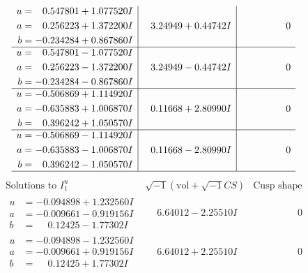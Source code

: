 \documentclass[1p]{elsarticle_modified}
\theoremstyle{definition}
\newcommand{\I}{\sqrt{-1}}
\begin{document}
$$\begin{array}{c|c|c}
\begin{aligned}
u &= \phantom{-}0.547801 + 1.077520 I \\
a &= \phantom{-}0.256223 + 1.372200 I \\
b &= -0.234284 + 0.867860 I\end{aligned}
 & \phantom{-}3.24949 + 0.44742 I & \phantom{-0.000000 } 0 \\ \hline\begin{aligned}
u &= \phantom{-}0.547801 - 1.077520 I \\
a &= \phantom{-}0.256223 - 1.372200 I \\
b &= -0.234284 - 0.867860 I\end{aligned}
 & \phantom{-}3.24949 - 0.44742 I & \phantom{-0.000000 } 0 \\ \hline\begin{aligned}
u &= -0.506869 + 1.114920 I \\
a &= -0.635883 + 1.006870 I \\
b &= \phantom{-}0.396242 + 1.050570 I\end{aligned}
 & \phantom{-}0.11668 + 2.80990 I & \phantom{-0.000000 } 0 \\ \hline\begin{aligned}
u &= -0.506869 - 1.114920 I \\
a &= -0.635883 - 1.006870 I \\
b &= \phantom{-}0.396242 - 1.050570 I\end{aligned}
 & \phantom{-}0.11668 - 2.80990 I & \phantom{-0.000000 } 0\\
 \hline 
 \end{array}$$\newpage$$\begin{array}{c|c|c}  
\text{Solutions to }I^u_{1}& \I (\text{vol} + \sqrt{-1}CS) & \text{Cusp shape}\\
 \hline 
\begin{aligned}
u &= -0.094898 + 1.232560 I \\
a &= -0.009661 - 0.919156 I \\
b &= \phantom{-}0.12425 - 1.77302 I\end{aligned}
 & \phantom{-}6.64012 - 2.25510 I & \phantom{-0.000000 } 0 \\ \hline\begin{aligned}
u &= -0.094898 - 1.232560 I \\
a &= -0.009661 + 0.919156 I \\
b &= \phantom{-}0.12425 + 1.77302 I\end{aligned}
 & \phantom{-}6.64012 + 2.25510 I & \phantom{-0.000000 } 0 \\ \hline\begin{aligned}

\end{aligned}
\end{array}$$
\end{document}
